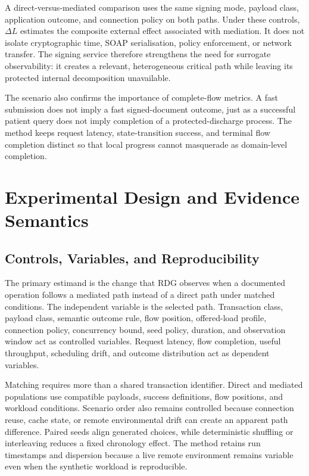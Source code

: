 \noindent A direct-versus-mediated comparison uses the same signing mode, payload
class, application outcome, and connection policy on both paths. Under these
controls, $\Delta L$ estimates the composite external effect associated with
mediation. It does not isolate cryptographic time, SOAP serialisation, policy
enforcement, or network transfer. The signing service therefore strengthens the
need for surrogate observability: it creates a relevant, heterogeneous critical
path while leaving its protected internal decomposition unavailable.

\noindent The scenario also confirms the importance of complete-flow metrics. A fast
submission does not imply a fast signed-document outcome, just as a successful
patient query does not imply completion of a protected-discharge process. The
method keeps request latency, state-transition success, and terminal flow
completion distinct so that local progress cannot masquerade as domain-level
completion.

\section{Experimental Design and Evidence Semantics}
\subsection{Controls, Variables, and Reproducibility}

\noindent The primary estimand is the change that RDG observes when a documented
operation follows a mediated path instead of a direct path under matched
conditions. The independent variable is the selected path. Transaction class,
payload class, semantic outcome rule, flow position, offered-load profile,
connection policy, concurrency bound, seed policy, duration, and observation
window act as controlled variables. Request latency, flow completion, useful
throughput, scheduling drift, and outcome distribution act as dependent
variables.

\noindent Matching requires more than a shared transaction identifier. Direct and mediated
populations use compatible payloads, success definitions, flow positions, and
workload conditions. Scenario order also remains controlled because connection
reuse, cache state, or remote environmental drift can create an apparent path
difference. Paired seeds align generated choices, while deterministic shuffling
or interleaving reduces a fixed chronology effect. The method retains run
timestamps and dispersion because a live remote environment remains variable even
when the synthetic workload is reproducible.

